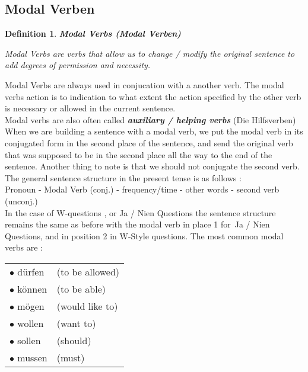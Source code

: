 \documentclass[a4paper,12pt]{article}
\newtheorem{mydef}{Definition}
\begin{document}
\subsection{\bf{Modal Verben}}
\begin{adjustwidth}{2em}{0pt}
\label{sec:modal_verben}

\begin{mydef}{\bf{Modal Verbs (Modal Verben)}}
\begin{defn-background}

Modal Verbs are verbs that allow us to change / modify the original sentence to
add degrees of permission and necessity.

\end{defn-background}
\end{mydef}
\vspace{0.25cm}

Modal Verbs are always used in conjucation with a another verb. The modal verbs
action is to indication to what extent the action specified by the other verb is
necessary or allowed in the current sentence.\\

Modal verbs are also often called \textbf{\textit{auxiliary / helping verbs}}
(Die Hilfsverben)\\

When we are building a sentence with a modal verb, we put the modal verb in its
conjugated form in the second place of the sentence, and send the original verb
that was supposed to be in the second place all the way to the end of the
sentence. Another thing to note is that we should not conjugate the second
verb.\\

The general sentence structure in the present tense is as follows :\\

Pronoun - Modal Verb (conj.) - frequency/time - other words - second verb
(unconj.)\\

In the case of W-questions , or Ja / Nien Questions the sentence structure
remains the same as before with the modal verb in place 1 for Ja / Nien
Questions, and in position 2 in W-Style questions. The most common modal verbs
are :


\vspace{0.3cm}
\begin{tabular}{l l}

\rowcolor{white} $\bullet$ dürfen & (to be allowed)  \\
\rowcolor{white} $\bullet$ können & (to be able)  \\
\rowcolor{white} $\bullet$ mögen & (would like to)  \\ 
\rowcolor{white} $\bullet$ wollen & (want to)  \\
\rowcolor{white} $\bullet$ sollen & (should)\\
\rowcolor{white} $\bullet$ mussen & (must) \\


\end{tabular}
\end{adjustwidth}
\end{document}
